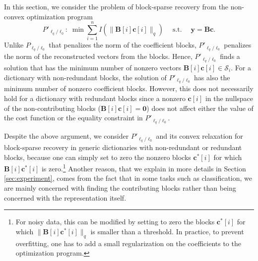 \documentclass[10pt,twocolumn,twoside] {IEEEtran}
\begin{document}
{In this section, we consider the problem of block-sparse recovery from the non-convex optimization program
\begin{equation*}
\label{eq:optL2L0M}
P'_{\ell_q/\ell_0}: \; \min \sum_{i=1}^{n} I(\| {\boldsymbol{B}}[i] {\boldsymbol{c}}[i] \|_q) \quad {\operatorname{s. t.}} \quad {\boldsymbol{y}} = {\boldsymbol{B}} {\boldsymbol{c}}.
\end{equation*}
Unlike $P_{\ell_q/\ell_0}$ that penalizes the norm of the coefficient blocks, $P'_{\ell_q/\ell_0}$ penalizes the norm of the reconstructed vectors from the blocks. Hence, $P'_{\ell_q/\ell_0}$ finds a solution that has the minimum number of nonzero vectors ${\boldsymbol{B}}[i] {\boldsymbol{c}}[i] \in {\mathcal{S}}_i$. For a dictionary with non-redundant blocks, the solution of $P'_{\ell_q/\ell_0}$ has also the minimum number of nonzero coefficient blocks. However, this does not necessarily hold for a dictionary with redundant blocks since a nonzero ${\boldsymbol{c}}[i]$ in the nullspace of the non-contributing blocks (${\boldsymbol{B}}[i] {\boldsymbol{c}}[i] = {\boldsymbol{0}}$) does not affect either the value of the cost function or the equality constraint in $P'_{\ell_q/\ell_0}$.

Despite the above argument, we consider $P'_{\ell_q/\ell_0}$ and its convex relaxation for block-sparse recovery in generic dictionaries with non-redundant or redundant blocks, because one can simply set to zero the nonzero blocks ${\boldsymbol{c}}^*[i]$ for which ${\boldsymbol{B}}[i] {\boldsymbol{c}}^*[i] $ is zero.\footnote{For noisy data, this can be modified by setting to zero the blocks ${\boldsymbol{c}}^*[i]$ for which $\| {\boldsymbol{B}}[i] {\boldsymbol{c}}^*[i] \|_q$ is smaller than a threshold. In practice, to prevent overfitting, one has to add a small regularization on the coefficients to the optimization program.} Another reason, that we explain in more details in Section \ref{sec:experiment}, comes from the fact that in some tasks such as classification, we are mainly concerned with finding the contributing blocks rather than being concerned with the representation itself. 

}
\end{document}
